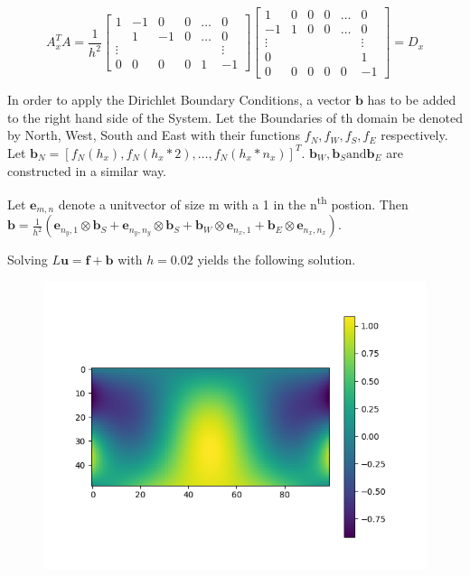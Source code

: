 \documentclass{article}
\begin{document}
\begin{equation}
    A_x^T A = \frac{1}{h^2}
    \begin{bmatrix}
        {1}         & {-1}   & {0}   & {0}   & {\ldots}  & {0} \\
        {}        & {1}   & {-1}   & {0}   & {\ldots}  & {0} \\
        {\vdots}    & {}   & {}    & {}    & {}        & {\vdots} \\
        {0}         & {0}    & {0}   & {0}   & {1}       & {-1}
        \end{bmatrix}
    \begin{bmatrix}
    {1} & {0} & {0} & {0} & {\ldots} & {0} \\
    {-1} & {1} & {0} & {0} & {\ldots} & {0} \\
    {\vdots} & {} & {} & {} & {} & {\vdots} \\
    {0} & {} & {} & {} & {} & {1} \\
     {0} & {0} & {0} & {0} & {0} & {-1}
    \end{bmatrix}= D_x
\end{equation}


In order to apply the Dirichlet Boundary Conditions, a vector $\mathbf{b}$ has to be added to the right hand side of the System. Let the Boundaries of th domain be denoted by North, West, South and East with their functions $f_N, f_W, f_S, f_E$ respectively. Let $\mathbf{b}_N = \left[f_N(h_x), f_N(h_x*2), \dots, f_N(h_x*n_x)\right]^T$. $\mathbf{b}_W, \mathbf{b}_S \text{and} \mathbf{b}_E$ are constructed in a similar way.\par
Let $\mathbf{e}_{m,n}$ denote a unitvector of size m with a 1 in the n\textsuperscript{th} postion.
Then $\mathbf{b} = \frac{1}{h^2}(\mathbf{e}_{n_y,1} \otimes \mathbf{b}_S + \mathbf{e}_{n_y,n_y} \otimes \mathbf{b}_S + \mathbf{b}_W \otimes \mathbf{e}_{n_x,1} + \mathbf{b}_E \otimes \mathbf{e}_{n_x,n_x})$.

Solving $L\mathbf{u} = \mathbf{f}+\mathbf{b}$ with $h=0.02$ yields the following solution.

\begin{figure}[H]
\centering
\includegraphics[width=.9\linewidth]{Figure_1.png}

\end{figure}

\end{document}
